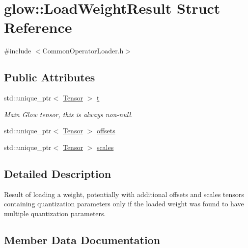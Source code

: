 \hypertarget{structglow_1_1_load_weight_result}{}\section{glow\+:\+:Load\+Weight\+Result Struct Reference}
\label{structglow_1_1_load_weight_result}


{\ttfamily \#include $<$Common\+Operator\+Loader.\+h$>$}

\subsection*{Public Attributes}
\begin{DoxyCompactItemize}
\item 
\mbox{\label{structglow_1_1_load_weight_result_ad2c5680f13b7efcfc8f678302ea9279c}} 
std\+::unique\+\_\+ptr$<$ \hyperlink{classglow_1_1_tensor}{Tensor} $>$ \hyperlink{structglow_1_1_load_weight_result_ad2c5680f13b7efcfc8f678302ea9279c}{t}
\begin{DoxyCompactList}\small\item\em Main Glow tensor, this is always non-\/null. \end{DoxyCompactList}\item 
std\+::unique\+\_\+ptr$<$ \hyperlink{classglow_1_1_tensor}{Tensor} $>$ \hyperlink{structglow_1_1_load_weight_result_abf5929aeb6bd1c78c687633590fa3b17}{offsets}
\item 
std\+::unique\+\_\+ptr$<$ \hyperlink{classglow_1_1_tensor}{Tensor} $>$ \hyperlink{structglow_1_1_load_weight_result_a65c468e00429585f1955b4b0373537e7}{scales}
\end{DoxyCompactItemize}


\subsection{Detailed Description}
Result of loading a weight, potentially with additional offsets and scales tensors containing quantization parameters only if the loaded weight was found to have multiple quantization parameters. 

\subsection{Member Data Documentation}
\mbox{\label{structglow_1_1_load_weight_result_abf5929aeb6bd1c78c687633590fa3b17}} 
